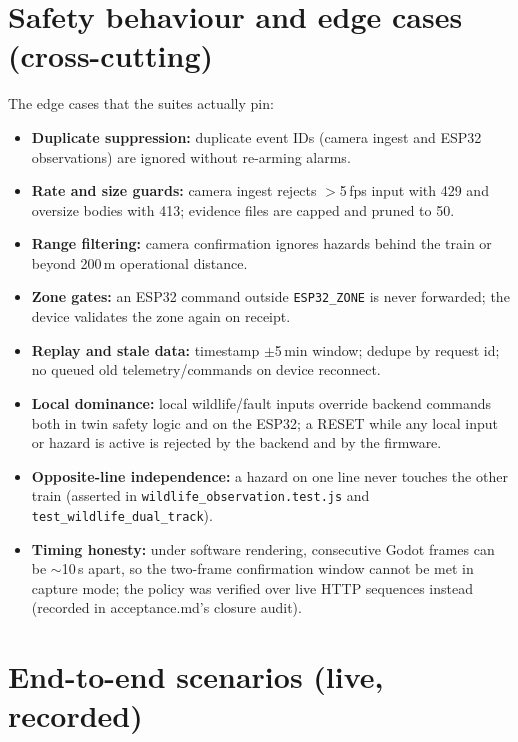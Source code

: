 \section{Safety behaviour and edge cases (cross-cutting)}\label{sec:features-safety}

The edge cases that the suites actually pin:

\begin{itemize}
  \item \textbf{Duplicate suppression:} duplicate event IDs (camera ingest
        and ESP32 observations) are ignored without re-arming alarms.
  \item \textbf{Rate and size guards:} camera ingest rejects $>$5\,fps
        input with 429 and oversize bodies with 413; evidence files are
        capped and pruned to 50.
  \item \textbf{Range filtering:} camera confirmation ignores hazards
        behind the train or beyond 200\,m operational distance.
  \item \textbf{Zone gates:} an ESP32 command outside \texttt{ESP32\_ZONE}
        is never forwarded; the device validates the zone again on receipt.
  \item \textbf{Replay and stale data:} timestamp $\pm$5\,min window;
        dedupe by request id; no queued old telemetry/commands on device
        reconnect.
  \item \textbf{Local dominance:} local wildlife/fault inputs override
        backend commands both in twin safety logic and on the ESP32; a
        RESET while any local input or hazard is active is rejected by the
        backend and by the firmware.
  \item \textbf{Opposite-line independence:} a hazard on one line never
        touches the other train (asserted in
        \texttt{wildlife\_observation.test.js} and
        \texttt{test\_wildlife\_dual\_track}).
  \item \textbf{Timing honesty:} under software rendering, consecutive
        Godot frames can be $\sim$10\,s apart, so the two-frame
        confirmation window cannot be met in capture mode; the policy was
        verified over live HTTP sequences instead (recorded in
        acceptance.md's closure audit).
\end{itemize}

\section{End-to-end scenarios (live, recorded)}

